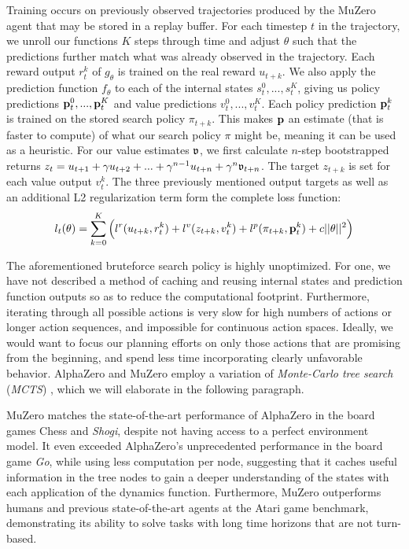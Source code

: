 Training occurs on previously observed trajectories produced by the MuZero agent that may be stored in a replay buffer. For each timestep $t$ in the trajectory, we unroll our functions $K$ steps through time and adjust $\theta$ such that the predictions further match what was already observed in the trajectory. Each reward output $r^k_t$ of $g_\theta$ is trained on the real reward $u_{t+k}$. We also apply the prediction function $f_\theta$ to each of the internal states $s^0_t, ..., s^K_t$, giving us policy predictions $\text{\textbf{p}}^0_t, ..., \text{\textbf{p}}^K_t$ and value predictions $v^0_t, ..., v^K_t$. Each policy prediction $\text{\textbf{p}}^k_t$ is trained on the stored search policy $\pi_{t+k}$. This makes $\text{\textbf{p}}$ an estimate (that is faster to compute) of what our search policy $\pi$ might be, meaning it can be used as a heuristic. For our value estimates $\mathfrak{v}$, we first calculate $n$-step bootstrapped returns $z_t = u_{t+1} + \gamma u_{t+2} + ... + \gamma^{n-1} u_{t+n} + \gamma^n\mathfrak{v}_{t+n}$. The target $z_{t+k}$ is set for each value output $v^k_t$. The three previously mentioned output targets as well as an additional L2 regularization term form the complete loss function:
\begin{equation*}
    l_t(\theta) = \sum^K_{k=0} \left(l^r(u_{t+k}, r_t^k) + l^v(z_{t+k}, v_t^k) + l^p(\pi_{t+k}, \text{\textbf{p}}_t^k) + c||\theta||^2\right)
\end{equation*}

The aforementioned bruteforce search policy is highly unoptimized. For one, we have not described a method of caching and reusing internal states and prediction function outputs so as to reduce the computational footprint. Furthermore, iterating through all possible actions is very slow for high numbers of actions or longer action sequences, and impossible for continuous action spaces. Ideally, we would want to focus our planning efforts on only those actions that are promising from the beginning, and spend less time incorporating clearly unfavorable behavior. AlphaZero and MuZero employ a variation of \textit{Monte-Carlo tree search} (\textit{MCTS}) \cite{mcts}, which we will elaborate in the following paragraph.

MuZero matches the state-of-the-art performance of AlphaZero in the board games Chess and \textit{Shogi}, despite not having access to a perfect environment model. It even exceeded AlphaZero's unprecedented performance in the board game \textit{Go}, while using less computation per node, suggesting that it caches useful information in the tree nodes to gain a deeper understanding of the states with each application of the dynamics function. Furthermore, MuZero outperforms humans and previous state-of-the-art agents at the Atari game benchmark, demonstrating its ability to solve tasks with long time horizons that are not turn-based.